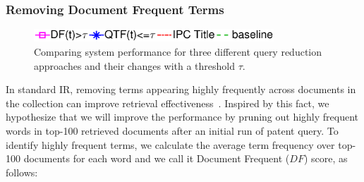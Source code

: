\subsubsection{Removing Document Frequent Terms}
\label{SimpleApproaches}
\begin{figure}[t!]
\begin{centering}
\includegraphics[width=9cm]{figs/l3}
\par\end{centering}

\begin{centering}
 \hspace*{1.5cm} 
\par\end{centering} 

\protect\caption{Comparing system performance for three different query reduction approaches and their changes with a threshold $\tau$.}
\label{fig:combinedapproach}
\end{figure}
In standard IR, removing terms appearing highly frequently across documents in the collection can improve retrieval effectiveness~\citep{manning2008introduction}. Inspired by this fact, we hypothesize that we will improve the performance by pruning out highly frequent words in top-100 retrieved documents after an initial run of patent query. To identify highly frequent terms, we calculate the average term frequency over top-100 documents for each word and we call it Document Frequent ($\mathit{DF}$) score, as follows:
